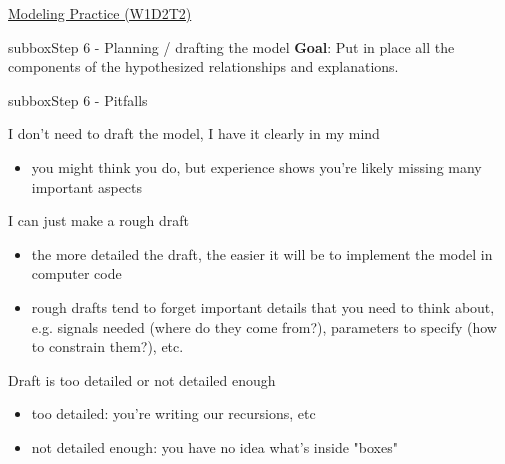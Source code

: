 \begin{textbox}{\href{https://compneuro.neuromatch.io/tutorials/W1D2_ModelingPractice/W1D2_Intro.html}{Modeling Practice  (W1D2T2)} }
\begin{subbox}{subbox}{Step 6 - Planning / drafting the model}
\textbf{Goal}: Put in place all the components of the hypothesized relationships and explanations.

  \end{subbox}
\begin{subbox}{subbox}{Step 6 - Pitfalls }
\scriptsize


I don't need to draft the model, I have it clearly in my mind
\begin{itemize}
    \item 

you might think you do, but experience shows you're likely missing many important aspects\end{itemize}

I can just make a rough draft
\begin{itemize}
    \item the more detailed the draft, the easier it will be to implement the model in computer code \item rough drafts tend to forget important details that you need to think about, e.g. signals needed (where do they come from?), parameters to specify (how to constrain them?), etc.\end{itemize}

Draft is too detailed or not detailed enough
\begin{itemize}
    \item too detailed: you're writing our recursions, etc \item not detailed enough: you have no idea what's inside "boxes"\end{itemize}
\end{subbox}
 
 
\end{textbox}
